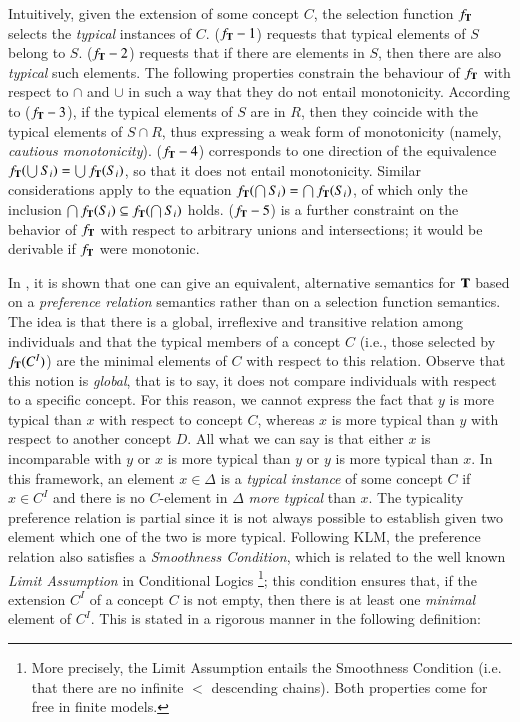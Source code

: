 \documentclass[a4paper, 11pt, oneside]{elsarticle}
\newcommand{\tip}{{\bf T}}
\newcommand{\incluso} {\subseteq}
\begin{document}
\noindent Intuitively, given the extension of some concept $C$, the selection function $f_\tip$ selects  the {\em typical} instances of $C$.
($f_\tip-1$) requests that typical elements of $S$ belong to $S$.
($f_\tip-2$) requests that if there are elements in $S$, then there are also {\em typical} such elements.
The following properties constrain the behaviour of $f_\tip$ with respect to $\cap$ and $\cup$ in such a way that they do not entail monotonicity.
According to ($f_\tip-3$), if the typical elements of $S$ are in $R$, then they coincide with the typical elements of $S \cap R$, thus expressing a weak form of monotonicity (namely, {\em cautious monotonicity}).
($f_\tip-4$) corresponds to one direction of the equivalence $f_\tip(\bigcup S_i) = \bigcup f_\tip(S_i)$, so that it does not entail monotonicity.
Similar considerations apply to the equation $f_\tip(\bigcap S_i) = \bigcap f_\tip(S_i)$, of which only the inclusion $\bigcap f_\tip(S_i) \incluso f_\tip(\bigcap S_i)$ holds. ($f_\tip-5$) is a further constraint on the behavior of $f_\tip$ with respect to arbitrary unions and intersections; it would be derivable if $f_\tip$ were monotonic.

In \cite{FI09}, it is shown that one can give an equivalent, alternative semantics for $\tip$ based on a \emph{preference relation} semantics rather than on a selection function semantics.
The idea is that there is a global, irreflexive and transitive relation among individuals and that the typical members of a concept $C$ (i.e., those selected by $f_\tip(C^I)$) are the minimal elements of $C$ with respect to this relation.
Observe that this notion is \emph{global}, that is to say, it does not compare individuals with respect to a specific concept.
For this reason,  we cannot express the fact that $y$ is more typical than $x$ with respect to concept $C$, whereas $x$ is more typical than $y$ with respect to another concept $D$.
All what we can say is that either $x$ is incomparable with $y$ or $x$ is more typical than $y$ or $y$ is more typical than $x$.
In this framework, an element $x \in \Delta$ is a {\em typical instance} of some concept $C$ if $x \in C^I$ and there is no $C$-element in $\Delta$ {\em more typical} than $x$.
The typicality preference relation is partial since it is not always possible to establish given two element which one of the two is more typical.
Following KLM, the preference relation also satisfies a \emph{Smoothness Condition}, which is related to the well known \emph{Limit Assumption} in Conditional Logics \cite{Nute80}
\footnote{More precisely, the Limit Assumption entails the Smoothness Condition (i.e. that there are no infinite $<$ descending chains). Both properties come for free in finite models.};
this condition ensures that, if the extension $C^I$ of a concept $C$ is not empty, then there is at least one \emph{minimal} element of $C^I$.
This is stated in a rigorous manner in the following definition:
\end{document}
